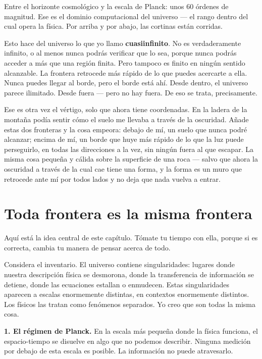 \documentclass[11pt, twoside, openright]{book}
\begin{document}
Entre el horizonte cosmológico y la escala de Planck: unos 60 órdenes de magnitud. Ese es el dominio computacional del universo --- el rango dentro del cual opera la física. Por arriba y por abajo, las cortinas están corridas.

Esto hace del universo lo que yo llamo \textbf{cuasiinfinito}. No es verdaderamente infinito, o al menos nunca podrás verificar que lo sea, porque nunca podrás acceder a más que una región finita. Pero tampoco es finito en ningún sentido alcanzable. La frontera retrocede más rápido de lo que puedes acercarte a ella. Nunca puedes llegar al borde, pero el borde está ahí. Desde dentro, el universo parece ilimitado. Desde fuera --- pero no hay fuera. De eso se trata, precisamente.

Ese es otra vez el vértigo, solo que ahora tiene coordenadas. En la ladera de la montaña podía sentir cómo el suelo me llevaba a través de la oscuridad. Añade estas dos fronteras y la cosa empeora: debajo de mí, un suelo que nunca podré alcanzar; encima de mí, un borde que huye más rápido de lo que la luz puede perseguirlo, en todas las direcciones a la vez, sin ningún fuera al que escapar. La misma cosa pequeña y cálida sobre la superficie de una roca --- salvo que ahora la oscuridad a través de la cual cae tiene una forma, y la forma es un muro que retrocede ante mí por todos lados y no deja que nada vuelva a entrar.


\section*{Toda frontera es la misma frontera}

Aquí está la idea central de este capítulo. Tómate tu tiempo con ella, porque si es correcta, cambia tu manera de pensar acerca de todo.

Considera el inventario. El universo contiene singularidades: lugares donde nuestra descripción física se desmorona, donde la transferencia de información se detiene, donde las ecuaciones estallan o enmudecen. Estas singularidades aparecen a escalas enormemente distintas, en contextos enormemente distintos. Los físicos las tratan como fenómenos separados. Yo creo que son todas la misma cosa.

\textbf{1. El régimen de Planck.} En la escala más pequeña donde la física funciona, el espacio-tiempo se disuelve en algo que no podemos describir. Ninguna medición por debajo de esta escala es posible. La información no puede atravesarlo.
\end{document}

